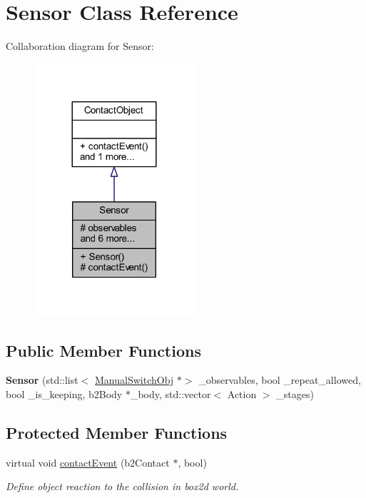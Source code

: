 \hypertarget{class_sensor}{}\section{Sensor Class Reference}
\label{class_sensor}


Collaboration diagram for Sensor\+:\nopagebreak
\begin{figure}[H]
\begin{center}
\leavevmode
\includegraphics[width=168pt]{class_sensor__coll__graph}
\end{center}
\end{figure}
\subsection*{Public Member Functions}
\begin{DoxyCompactItemize}
\item 
\mbox{\label{class_sensor_a7988853c8a9278171ce8956ccdde63c8}} 
{\bfseries Sensor} (std\+::list$<$ \hyperlink{class_manual_switch_obj}{Manual\+Switch\+Obj} $\ast$$>$ \+\_\+observables, bool \+\_\+repeat\+\_\+allowed, bool \+\_\+is\+\_\+keeping, b2\+Body $\ast$\+\_\+body, std\+::vector$<$ Action $>$ \+\_\+stages)
\end{DoxyCompactItemize}
\subsection*{Protected Member Functions}
\begin{DoxyCompactItemize}
\item 
virtual void \hyperlink{class_sensor_a08bfa36c84277677f3bd5fb14127fca7}{contact\+Event} (b2\+Contact $\ast$, bool)
\begin{DoxyCompactList}\small\item\em Define object reaction to the collision in box2d world. \end{DoxyCompactList}\end{DoxyCompactItemize}

